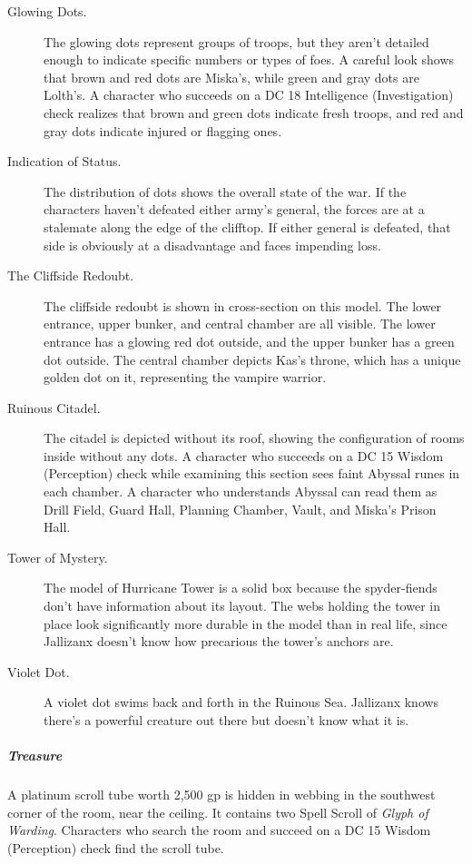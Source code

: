 \documentclass[10pt,a4paper,twoside,bg=print,twocolumn,openany,nodeprecatedcode]{dndbook}
\begin{document}
\begin{description}
\item[Glowing Dots.]
The glowing dots represent groups of troops, but they aren't detailed enough to indicate specific numbers or types of foes. A careful look shows that brown and red dots are Miska's, while green and gray dots are Lolth's. A character who succeeds on a DC 18 Intelligence (Investigation) check realizes that brown and green dots indicate fresh troops, and red and gray dots indicate injured or flagging ones.
\item[Indication of Status.]
The distribution of dots shows the overall state of the war. If the characters haven't defeated either army's general, the forces are at a stalemate along the edge of the clifftop. If either general is defeated, that side is obviously at a disadvantage and faces impending loss.
\item[The Cliffside Redoubt.]
The cliffside redoubt is shown in cross-section on this model. The lower entrance, upper bunker, and central chamber are all visible. The lower entrance has a glowing red dot outside, and the upper bunker has a green dot outside. The central chamber depicts Kas's throne, which has a unique golden dot on it, representing the vampire warrior.
\item[Ruinous Citadel.]
The citadel is depicted without its roof, showing the configuration of rooms inside without any dots. A character who succeeds on a DC 15 Wisdom (Perception) check while examining this section sees faint Abyssal runes in each chamber. A character who understands Abyssal can read them as Drill Field, Guard Hall, Planning Chamber, Vault, and Miska's Prison Hall.
\item[Tower of Mystery.]
The model of Hurricane Tower is a solid box because the spyder-fiends don't have information about its layout. The webs holding the tower in place look significantly more durable in the model than in real life, since Jallizanx doesn't know how precarious the tower's anchors are.
\item[Violet Dot.]
A violet dot swims back and forth in the Ruinous Sea. Jallizanx knows there's a powerful creature out there but doesn't know what it is.
\end{description}

\subparagraph{Treasure}
A platinum scroll tube worth 2,500 gp is hidden in webbing in the southwest corner of the room, near the ceiling. It contains two Spell Scroll of \textit{Glyph of Warding}. Characters who search the room and succeed on a DC 15 Wisdom (Perception) check find the scroll tube.
\end{document}
